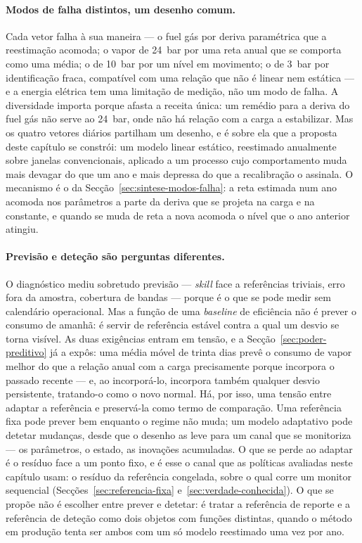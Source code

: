 \paragraph{Modos de falha distintos, um desenho comum.} Cada vetor falha à
sua maneira --- o fuel gás por deriva paramétrica que a reestimação acomoda;
o vapor de 24~bar por uma reta anual que se comporta como uma média; o de
10~bar por um nível em movimento; o de 3~bar por identificação fraca,
compatível com uma relação que não é linear nem estática --- e a energia
elétrica tem uma limitação de medição, não um modo de falha. A diversidade
importa porque afasta a receita única: um remédio para a deriva do fuel gás
não serve ao 24~bar, onde não há relação com a carga a estabilizar. Mas os
quatro vetores diários partilham um desenho, e é sobre ela que a
proposta deste capítulo se constrói: um modelo linear estático, reestimado
anualmente sobre janelas convencionais, aplicado a um processo cujo
comportamento muda mais devagar do que um ano e mais depressa do que a
recalibração o assinala. O mecanismo é o da Secção~\ref{sec:sintese-modos-falha}:
a reta estimada num ano acomoda nos parâmetros a parte da deriva que se
projeta na carga e na constante, e quando se muda de reta a nova acomoda o
nível que o ano anterior atingiu.

\paragraph{Previsão e deteção são perguntas diferentes.} O diagnóstico mediu
sobretudo previsão --- \emph{skill} face a referências triviais, erro fora
da amostra, cobertura de bandas --- porque é o que se pode medir sem
calendário operacional. Mas a função de uma \emph{baseline} de eficiência
não é prever o consumo de amanhã: é servir de referência estável contra a
qual um desvio se torna visível. As duas exigências entram em tensão, e a
Secção~\ref{sec:poder-preditivo} já a expôs: uma média móvel de trinta dias
prevê o consumo de vapor melhor do que a relação anual com a carga
precisamente porque incorpora o passado recente --- e, ao incorporá-lo,
incorpora também qualquer desvio persistente, tratando-o como o novo
normal. Há, por isso, uma tensão entre adaptar a referência e
preservá-la como termo de comparação. Uma referência fixa pode prever bem
enquanto o regime não muda; um modelo adaptativo pode detetar mudanças,
desde que o desenho as leve para um canal que se monitoriza --- os
parâmetros, o estado, as inovações acumuladas. O que se perde ao adaptar é o
resíduo face a um ponto fixo, e é esse o canal que as políticas avaliadas
neste capítulo usam: o resíduo da referência congelada, sobre o qual corre
um monitor sequencial (Secções~\ref{sec:referencia-fixa}
e~\ref{sec:verdade-conhecida}). O que se propõe não é escolher entre prever
e detetar: é tratar a referência de reporte e a referência de deteção como
dois objetos com funções distintas, quando o método em produção tenta ser
ambos com um só modelo reestimado uma vez por ano.

